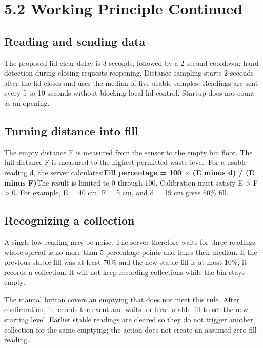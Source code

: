 \documentclass[11pt,a4paper]{article}
\begin{document}
\clearpage
\section*{5.2 Working Principle Continued}
\subsection*{Reading and sending data}
The proposed lid clear delay is 3 seconds, followed by a 2 second cooldown; hand detection during closing requests reopening. Distance sampling starts 2 seconds after the lid closes and uses the median of five usable samples. Readings are sent every 5 to 10 seconds without blocking local lid control. Startup does not count as an opening.\par


\subsection*{Turning distance into fill}
The empty distance E is measured from the sensor to the empty bin floor. The full distance F is measured to the highest permitted waste level. For a usable reading d, the server calculates:\newline \textbf{Fill percentage = 100 \(\times\) (E minus d) / (E minus F)}\newline The result is limited to 0 through 100. Calibration must satisfy E > F > 0. For example, E = 40 cm, F = 5 cm, and d = 19 cm gives 60\% fill.\par

\subsection*{Recognizing a collection}
A single low reading may be noise. The server therefore waits for three readings whose spread is no more than 5 percentage points and takes their median. If the previous stable fill was at least 70\% and the new stable fill is at most 10\%, it records a collection. It will not keep recording collections while the bin stays empty.\par

The manual button covers an emptying that does not meet this rule. After confirmation, it records the event and waits for fresh stable fill to set the new starting level. Earlier stable readings are cleared so they do not trigger another collection for the same emptying; the action does not create an assumed zero fill reading.\par
\end{document}
